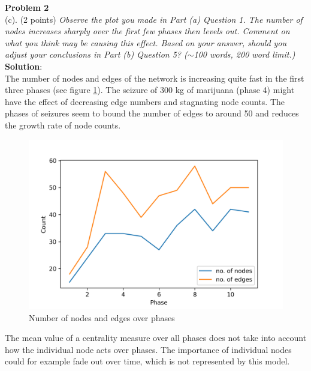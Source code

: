 \textbf{Problem 2}\\
(c). (2 points) \textsl{Observe the plot you made in Part (a) Question 1. The number of nodes increases sharply over the first few phases then levels out. Comment on what you think may be causing this effect. Based on your answer, should you adjust your conclusions in Part (b) Question 5? ($\sim$100 words, 200 word limit.)}\\

\textbf{Solution}:\\
The number of nodes and edges of the network is increasing quite fast in the first three phases (see figure \ref{fig:nodes_edges}). The seizure of 300 kg of marijuana (phase 4) might have the effect of decreasing edge numbers and stagnating node counts. The phases of seizures seem to bound the number of edges to around 50 and reduces the growth rate of node counts.\\

\begin{figure}[h]
	\centering
	\includegraphics[width=0.7\linewidth]{problem_02/nodes_edges}
	\caption{Number of nodes and edges over phases}
	\label{fig:nodes_edges}
\end{figure}

The mean value of a centrality measure over all phases does not take into account how the individual node acts over phases. The importance of individual nodes could for example fade out over time, which is not represented by this model.\\